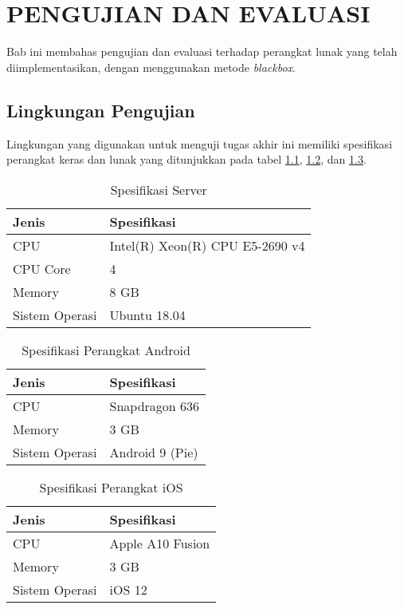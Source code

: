 \chapter{PENGUJIAN DAN EVALUASI}
\par Bab ini membahas pengujian dan evaluasi terhadap perangkat lunak yang telah diimplementasikan, dengan menggunakan metode \textit{blackbox}.

\section{Lingkungan Pengujian}
\par Lingkungan yang digunakan untuk menguji tugas akhir ini memiliki spesifikasi perangkat keras dan lunak yang ditunjukkan pada tabel \ref{5:tabel_spesifikasi_server}, \ref{5:tabel_spesifikasi_perangkat_android}, dan \ref{5:tabel_spesifikasi_perangkat_ios}.
\begin{longtable}{|p{2.5cm}|p{6.5cm}|}
	\caption{Spesifikasi Server} \label{5:tabel_spesifikasi_server} \\ \hline
    \textbf{Jenis} & \textbf{Spesifikasi} \\ \hline
    CPU & Intel(R) Xeon(R) CPU E5-2690 v4 \\ \hline
    CPU Core & 4 \\ \hline
    Memory & 8 GB \\ \hline
    Sistem Operasi & Ubuntu 18.04 \\ \hline
\end{longtable}
\begin{longtable}{|p{2.5cm}|p{6.5cm}|}
	\caption{Spesifikasi Perangkat Android} \label{5:tabel_spesifikasi_perangkat_android} \\ \hline
    \textbf{Jenis} & \textbf{Spesifikasi} \\ \hline
    CPU & Snapdragon 636 \\ \hline
    Memory & 3 GB \\ \hline
    Sistem Operasi & Android 9 (Pie) \\ \hline
\end{longtable}
\begin{longtable}{|p{2.5cm}|p{6.5cm}|}
	\caption{Spesifikasi Perangkat iOS} \label{5:tabel_spesifikasi_perangkat_ios} \\ \hline
    \textbf{Jenis} & \textbf{Spesifikasi} \\ \hline
    CPU & Apple A10 Fusion \\ \hline
    Memory & 3 GB \\ \hline
    Sistem Operasi & iOS 12 \\ \hline
\end{longtable}

